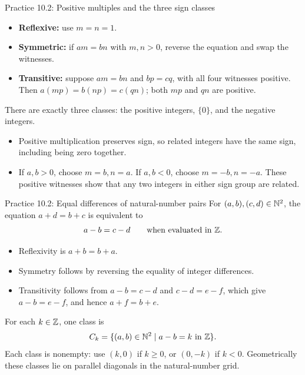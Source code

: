 \begin{frame}{Practice 10.2: Positive multiples and the three sign classes}
\begin{itemize}
\item \textbf{Reflexive:} use $m=n=1$.
\item \textbf{Symmetric:} if $am=bn$ with $m,n>0$, reverse the equation and swap the witnesses.
\item \textbf{Transitive:} suppose $am=bn$ and $bp=cq$, with all four witnesses positive.
Then $a(mp)=b(np)=c(qn)$; both $mp$ and $qn$ are positive.
\end{itemize}
There are exactly three classes: the positive integers, $\{0\}$, and the negative integers.
\begin{itemize}
\item Positive multiplication preserves sign, so related integers have the same sign,
including being zero together.
\item If $a,b>0$, choose $m=b,n=a$. If $a,b<0$, choose $m=-b,n=-a$.
These positive witnesses show that any two integers in either sign group are related.
\end{itemize}
\end{frame}

\begin{frame}{Practice 10.2: Equal differences of natural-number pairs}
For $(a,b),(c,d)\in\mathbb{N}^2$, the equation $a+d=b+c$ is equivalent to
\[
 a-b=c-d\qquad\text{when evaluated in }\mathbb{Z}.
\]
\begin{itemize}
\item Reflexivity is $a+b=b+a$.
\item Symmetry follows by reversing the equality of integer differences.
\item Transitivity follows from $a-b=c-d$ and $c-d=e-f$, which give $a-b=e-f$,
and hence $a+f=b+e$.
\end{itemize}
For each $k\in\mathbb{Z}$, one class is
\[
 C_k=\{(a,b)\in\mathbb{N}^2\mid a-b=k\text{ in }\mathbb{Z}\}.
\]
Each class is nonempty: use $(k,0)$ if $k\ge0$, or $(0,-k)$ if $k<0$.
Geometrically these classes lie on parallel diagonals in the natural-number grid.
\end{frame}

